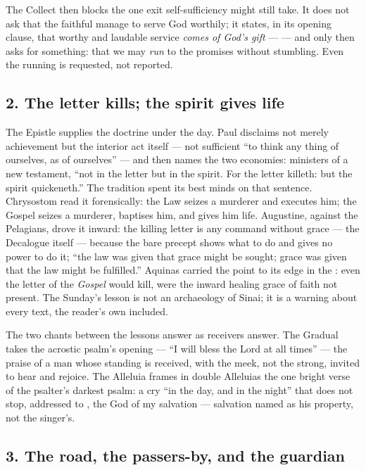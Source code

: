 The Collect then blocks the one exit self-sufficiency might still take. It
does not ask that the faithful manage to serve God worthily; it states, in
its opening clause, that worthy and laudable service \textit{comes of God's
gift} ---  --- and only then asks for something:
that we may \textit{run} to the promises without stumbling. Even the running
is requested, not reported.

\subsection*{2. The letter kills; the spirit gives life}

The Epistle supplies the doctrine under the day. Paul disclaims not merely
achievement but the interior act itself --- not sufficient ``to think any
thing of ourselves, as of ourselves'' --- and then names the two economies:
ministers of a new testament, ``not in the letter but in the spirit. For the
letter killeth: but the spirit quickeneth.'' The tradition spent its best
minds on that sentence. Chrysostom read it forensically: the Law seizes a
murderer and executes him; the Gospel seizes a murderer, baptises him, and
gives him life. Augustine, against the Pelagians, drove it inward: the
killing letter is any command without grace --- the Decalogue itself ---
because the bare precept shows what to do and gives no power to do it; ``the
law was given that grace might be sought; grace was given that the law might
be fulfilled.'' Aquinas carried the point to its edge in the :
even the letter of the \textit{Gospel} would kill, were the inward healing
grace of faith not present. The Sunday's lesson is not an archaeology of
Sinai; it is a warning about every text, the reader's own included.

The two chants between the lessons answer as receivers answer. The Gradual
takes the acrostic psalm's opening --- ``I will bless the Lord at all
times'' --- the praise of a man whose standing is received, with the meek,
not the strong, invited to hear and rejoice. The Alleluia frames in double
Alleluias the one bright verse of the psalter's darkest psalm: a cry ``in
the day, and in the night'' that does not stop, addressed to , the God of my salvation --- salvation named as his property,
not the singer's.

\subsection*{3. The road, the passers-by, and the guardian}


